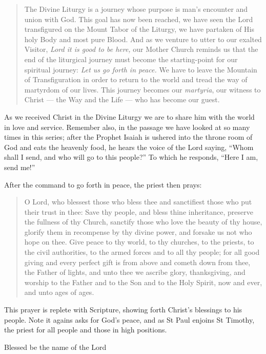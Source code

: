 \documentclass[
]{article}
\begin{document}
\begin{quote}
The Divine Liturgy is a journey whose purpose is man's encounter and
union with God. This goal has now been reached, we have seen the Lord
transfigured on the Mount Tabor of the Liturgy, we have partaken of His
holy Body and most pure Blood. And as we venture to utter to our exalted
Visitor, \emph{Lord it is good to be here,} our Mother Church reminds us
that the end of the liturgical journey must become the starting-point
for our spiritual journey: \emph{Let us go forth in peace.} We have to
leave the Mountain of Transfiguration in order to return to the world
and tread the way of martyrdom of our lives. This journey becomes our
\emph{martyria}, our witness to Christ --- the Way and the Life --- who
has become our guest.
\end{quote}

As we received Christ in the Divine Liturgy we are to share him with the
world in love and service. Remember also, in the passage we have looked
at so many times in this series; after the Prophet Isaiah is ushered
into the throne room of God and eats the heavenly food, he hears the
voice of the Lord saying, ``Whom shall I send, and who will go to this
people?'' To which he responds, ``Here I am, send me!''

After the command to go forth in peace, the priest then prays:

\begin{quote}
O Lord, who blessest those who bless thee and sanctifiest those who put
their trust in thee: Save thy people, and bless thine inheritance,
preserve the fullness of thy Church, sanctify those who love the beauty
of thy house, glorify them in recompense by thy divine power, and
forsake us not who hope on thee. Give peace to thy world, to thy
churches, to the priests, to the civil authorities, to the armed forces
and to all thy people; for all good giving and every perfect gift is
from above and cometh down from thee, the Father of lights, and unto
thee we ascribe glory, thanksgiving, and worship to the Father and to
the Son and to the Holy Spirit, now and ever, and unto ages of ages.
\end{quote}

This prayer is replete with Scripture, showing forth Christ's blessings
to his people. Note it agains asks for God's peace, and as St Paul
enjoins St Timothy, the priest for all people and those in high
positions.

Blessed be the name of the Lord
\end{document}
